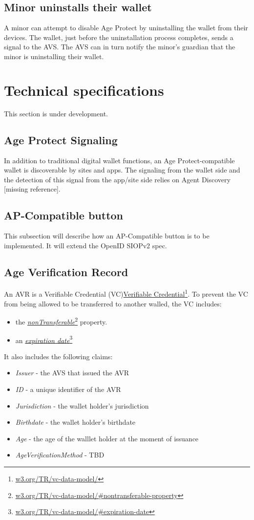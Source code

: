 \documentclass[11pt, oneside]{article}   	%
\newcommand{\hyperfootnote}[1][]{\def\ArgI{{#1}}\hyperfootnoteRelay}
\newcommand\hyperfootnoteRelay[2][]{\href{#1#2}{\ArgI}\footnote{\href{#1#2}{#2}}}
\begin{document}
\subsection{Minor uninstalls their wallet}

A minor can attempt to disable Age Protect by uninstalling the wallet from their devices. The wallet, just before the uninstallation process completes, sends a signal to the AVS. The AVS can in turn notify the minor's guardian that the minor is uninstalling their wallet.


\section{Technical specifications}

This section is under development.

\subsection{Age Protect Signaling}
 
In addition to traditional digital wallet functions, an Age Protect-compatible wallet is discoverable by sites and apps. The signaling from the wallet side and the detection of this signal from the app/site side relies on Agent Discovery [missing reference].

\subsection{AP-Compatible button}
This subsection will describe how an AP-Compatible button is to be implemented. It will extend the OpenID SIOPv2 spec. 

\subsection{Age Verification Record}

An AVR is a Verifiable Credential (VC)\hyperfootnote[Verifiable Credential][https://]{w3.org/TR/vc-data-model/}. To prevent the VC from being allowed to be transferred to another walled, the VC includes:
\begin{itemize}
	\item the \hyperfootnote[\emph{nonTransferable}][https://]{w3.org/TR/vc-data-model/\#nontransferable-property} property. 
	\item an \hyperfootnote[\emph{expiration date}][https://]{w3.org/TR/vc-data-model/\#expiration-date}
\end{itemize}
It also includes the following claims:
\begin{itemize}
	\item \emph{Issuer} - the AVS that issued the AVR
	\item \emph{ID} - a unique identifier of the AVR
	\item \emph{Jurisdiction} - the wallet holder's jurisdiction
	\item \emph{Birthdate} - the wallet holder's birthdate
	\item \emph{Age} - the age of the walllet holder at the moment of issuance
	\item \emph{AgeVerificationMethod} - TBD
\end{itemize}
\end{document}
